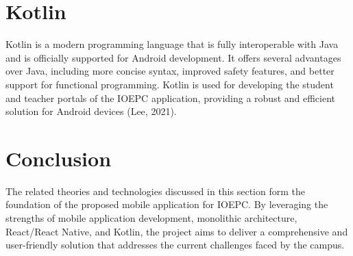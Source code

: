 \section{Kotlin}
Kotlin is a modern programming language that is fully interoperable with Java and is officially supported for Android development. It offers several advantages over Java, including more concise syntax, improved safety features, and better support for functional programming. Kotlin is used for developing the student and teacher portals of the IOEPC application, providing a robust and efficient solution for Android devices (Lee, 2021).

\section{Conclusion}
The related theories and technologies discussed in this section form the foundation of the proposed mobile application for IOEPC. By leveraging the strengths of mobile application development, monolithic architecture, React/React Native, and Kotlin, the project aims to deliver a comprehensive and user-friendly solution that addresses the current challenges faced by the campus.
